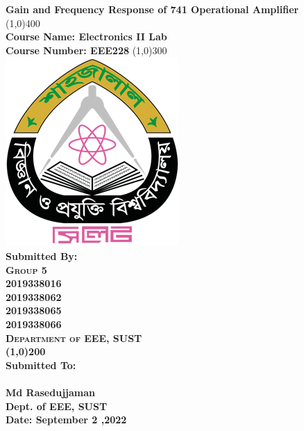 \documentclass[12pt]{article}
\begin{document}
\begin{titlepage}
\begin{center}
    \LARGE{\bfseries Gain and Frequency Response of 741 Operational Amplifier}\\
    \line(1,0){400}\\
    \Large{\bfseries Course Name: Electronics II Lab\\Course Number: EEE228}
    \line(1,0){300}\\
    [.5cm]
    \includegraphics[scale=2]{SUST_Logo.png}\\
    [.5cm]
    \bfseries{Submitted By:\\} 
    \textsc{\large Group 5\\
    2019338016\\
    2019338062\\
    2019338065\\
    2019338066\\
    Department of EEE, SUST}\\
    \line(1,0){200}\\
    \bfseries{Submitted To:\\}\\ 
    [.5cm]
    \large Md Rasedujjaman\\
    \large Dept. of EEE, SUST\\
    [.5cm]
    \small Date: September 2 ,2022
   
    
    
\end{center}

\end{titlepage}
\end{document}
